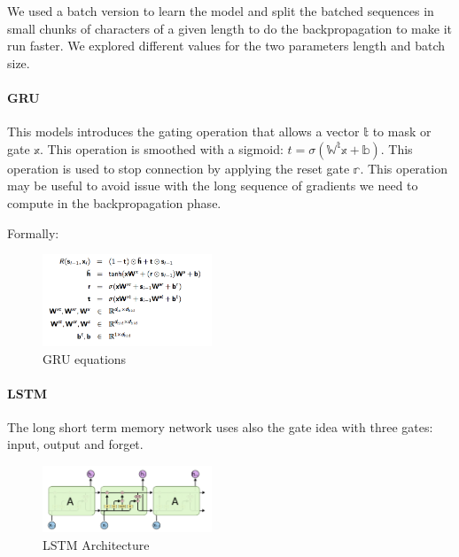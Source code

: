 \documentclass[11pt]{article}
\begin{document}
We used a batch version to learn the model and split the batched sequences in small chunks of characters of a given length to do the backpropagation to make it run faster. We explored different values for the two parameters length and batch size. 


\paragraph{GRU}

This models introduces the gating operation that allows a vector $\mathbb{t}$ to mask or gate $\mathbb{x}$. This operation is smoothed with a sigmoid: $t = \sigma(\mathbb{W^t}\mathbb{x} + \mathbb{b})$. This operation is used to stop connection by applying the reset gate $\mathbb{r}$. This operation may be useful to avoid issue with the long sequence of gradients we need to compute in the backpropagation phase.

Formally:

\begin{figure}[H]
\begin{center}
    \includegraphics[width=0.45\textwidth]{gru.png}
    \caption{GRU equations}
\end{center}
\end{figure}

\paragraph{LSTM}

The long short term memory network uses also the gate idea with three gates: input, output and forget.

\begin{figure}[H]
\begin{center}
    \includegraphics[width=0.45\textwidth]{lstm.png}
    \caption{LSTM Architecture}
\end{center}
\end{figure}
\end{document}
